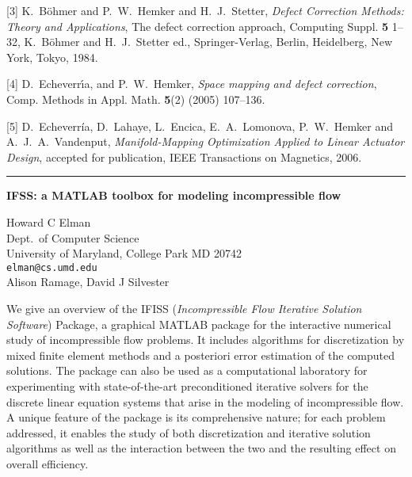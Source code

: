 \documentclass[twosided]{report}
\begin{document}
[3]
K.~B{\"o}hmer and P.~W.~Hemker and H.~J.~Stetter,
{\em Defect Correction Methods: Theory and
Applications}, The defect correction approach,
Computing Suppl. {\bf 5} 1--32,
K.~B{\"o}hmer and H.~J.~Stetter ed.,
Springer-Verlag, Berlin, Heidelberg, New York, Tokyo, 1984.

[4]
D.~Echeverr\'{\i}a, and P.~W.~Hemker,
{\em Space mapping and defect correction},
Comp. Methods in Appl. Math. {\bf 5}(2) (2005) 107--136.

[5]
D.~Echeverr\'{i}a, D.~Lahaye, L.~Encica,
E.~A.~Lomonova, P.~W.~Hemker and A.~J.~A.~Vandenput,
{\em Manifold-Mapping Optimization Applied to Linear
Actuator Design},
accepted for publication,
IEEE Transactions on Magnetics, 2006.



	\begin{center} \rule{6in}{1pt} \end{center}

\newpage

\begin{center}
{\large			%
{\bf IFSS: a MATLAB toolbox for modeling incompressible flow}}

	Howard C Elman \\
	Dept.~of Computer Science \\
	University of Maryland, College Park MD 20742 \\
	{\tt elman@cs.umd.edu} \\
	Alison Ramage, David J Silvester
\end{center}
We give an overview of the IFISS ({\em Incompressible Flow
Iterative Solution Software}) Package, a graphical MATLAB
package for the interactive numerical study of
incompressible flow problems. It includes algorithms for
discretization by mixed finite element methods and a
posteriori error estimation of the computed solutions. The
package can also be used as a computational laboratory for
experimenting with state-of-the-art preconditioned iterative
solvers for the discrete linear equation systems that arise
in the modeling of incompressible flow. A unique feature of
the package is its comprehensive nature; for each problem
addressed, it enables the study of both discretization and
iterative solution algorithms as well as the interaction
between the two and the resulting effect on overall
efficiency.
\end{document}
